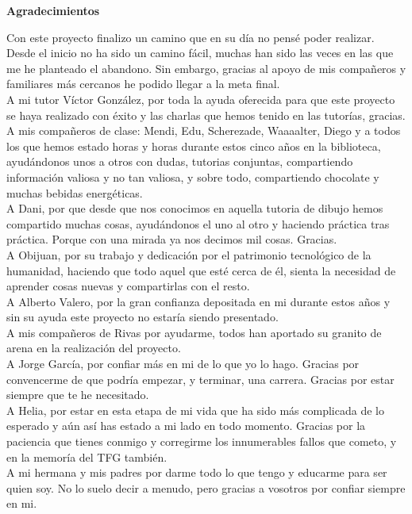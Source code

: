 \newpage{}
\thispagestyle{empty}
\begin{center}
    \Large
    \vspace{0.9cm}
    \textbf{Agradecimientos}
\end{center}

Con este proyecto finalizo un camino que en su día no pensé poder realizar. Desde el inicio no ha sido un camino fácil, muchas han sido las veces en las que me he planteado el abandono. Sin embargo, gracias al apoyo de mis compañeros y familiares más cercanos he podido llegar a la meta final.\\

A mi tutor Víctor González, por toda la ayuda oferecida para que este proyecto se haya realizado con éxito y las charlas que hemos tenido en las tutorías, gracias.\\

A mis compañeros de clase: Mendi, Edu, Scherezade, Waaaalter, Diego y a todos los que hemos estado horas y horas durante estos cinco años en la biblioteca, ayudándonos unos a otros con dudas, tutorias conjuntas, compartiendo información valiosa y no tan valiosa, y sobre todo, compartiendo chocolate y muchas bebidas energéticas. \\

A Dani, por que desde que nos conocimos en aquella tutoria de dibujo hemos compartido muchas cosas, ayudándonos el uno al otro y haciendo práctica tras práctica. Porque con una mirada ya nos decimos mil cosas. Gracias.\\

A Obijuan, por su trabajo y dedicación por el patrimonio tecnológico de la humanidad, haciendo que todo aquel que esté cerca de él, sienta la necesidad de aprender cosas nuevas y compartirlas con el resto.\\

A Alberto Valero, por la gran confianza depositada en mi durante estos años y sin su ayuda este proyecto no estaría siendo presentado.\\

A mis compañeros de Rivas por ayudarme, todos han aportado su granito de arena en la realización del proyecto.\\

A Jorge García, por confiar más en mi de lo que yo lo hago. Gracias por convencerme de que podría empezar, y terminar, una carrera. Gracias por estar siempre que te he necesitado.\\

A Helia, por estar en esta etapa de mi vida que ha sido más complicada de lo esperado y aún así has estado a mi lado en todo momento. Gracias por la paciencia que tienes conmigo y corregirme los innumerables fallos que cometo, y en la memoría del TFG también.\\

A mi hermana y mis padres por darme todo lo que tengo y educarme para ser quien soy. No lo suelo decir a menudo, pero gracias a vosotros por confiar siempre en mi.